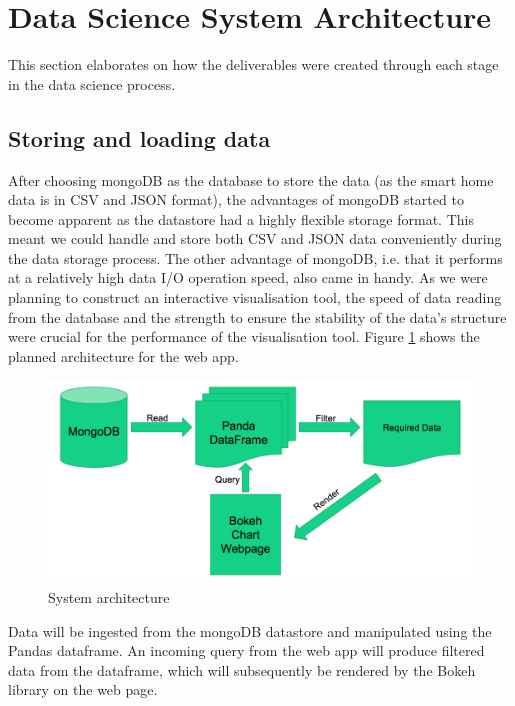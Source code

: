\documentclass[fleqn,10pt]{SelfArx} %
\begin{document}
\section{Data Science System Architecture}
This section elaborates on how the deliverables were created through each stage in the data science process.

	\subsection{Storing and loading data}
After choosing mongoDB as the database to store the data (as the smart home data is in CSV and JSON format), the advantages of mongoDB started to become apparent as the datastore had a highly flexible storage format. This meant we could handle and store both CSV and JSON data conveniently during the data storage process. The other advantage of mongoDB, i.e. that it performs at a relatively high data I/O operation speed, also came in handy. As we were planning to construct an interactive visualisation tool, the speed of data reading from the database and the strength to ensure the stability of  the data’s structure  were crucial for the performance of the visualisation tool. Figure \ref{fig:sys-arc} shows the planned architecture for the web app. \\

\begin{figure}[!h] \centering
	\includegraphics[scale=0.2]{sys-arc} 
	\caption{System architecture}
	\label{fig:sys-arc}
\end{figure}

Data will be ingested from the mongoDB datastore and manipulated using the Pandas dataframe. An incoming query from the web app will produce filtered data from the dataframe, which will subsequently be rendered by the Bokeh library on the web page. \\
\end{document}
